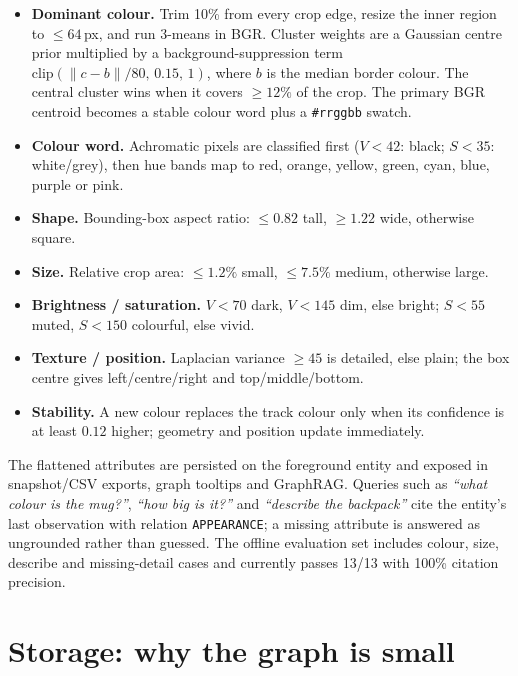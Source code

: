 \documentclass[10pt,a4paper]{article}
\newcommand{\code}[1]{\texttt{\small #1}}
\begin{document}
\begin{itemize}[leftmargin=1.1em,itemsep=1pt,topsep=1pt]
  \item \textbf{Dominant colour.} Trim 10\% from every crop edge, resize the
  inner region to $\leq 64$\,px, and run $3$-means in BGR.  Cluster weights are
  a Gaussian centre prior multiplied by a background-suppression term
  $\mathrm{clip}(\lVert c-b\rVert/80,\,0.15,\,1)$, where $b$ is the median
  border colour.  The central cluster wins when it covers $\geq 12\%$ of the
  crop.  The primary BGR centroid becomes a stable colour word plus a
  \code{\#rrggbb} swatch.
  \item \textbf{Colour word.} Achromatic pixels are classified first
  ($V<42$: black; $S<35$: white/grey), then hue bands map to red, orange,
  yellow, green, cyan, blue, purple or pink.
  \item \textbf{Shape.} Bounding-box aspect ratio: $\leq 0.82$ tall,
  $\geq 1.22$ wide, otherwise square.
  \item \textbf{Size.} Relative crop area: $\leq 1.2\%$ small,
  $\leq 7.5\%$ medium, otherwise large.
  \item \textbf{Brightness / saturation.} $V<70$ dark, $V<145$ dim, else
  bright; $S<55$ muted, $S<150$ colourful, else vivid.
  \item \textbf{Texture / position.} Laplacian variance $\geq 45$ is detailed,
  else plain; the box centre gives left/centre/right and top/middle/bottom.
  \item \textbf{Stability.} A new colour replaces the track colour only when
  its confidence is at least $0.12$ higher; geometry and position update
  immediately.
\end{itemize}

The flattened attributes are persisted on the foreground entity and exposed in
snapshot/CSV exports, graph tooltips and GraphRAG.  Queries such as
\emph{``what colour is the mug?''}, \emph{``how big is it?''} and
\emph{``describe the backpack''} cite the entity's last observation with
relation \code{APPEARANCE}; a missing attribute is answered as ungrounded rather
than guessed.  The offline evaluation set includes colour, size, describe and
missing-detail cases and currently passes 13/13 with 100\% citation precision.

\section{Storage: why the graph is small}
\end{document}

